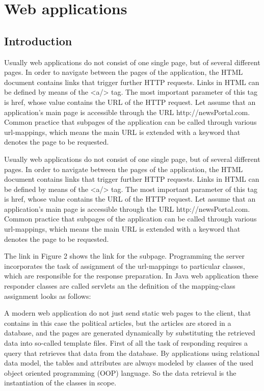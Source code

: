 \section{Web applications}

\subsection{Introduction}

Usually web applications do not consist of one single page, but of several different pages. In order to navigate between the pages of the application, the HTML document contains links that trigger further HTTP requests. Links in HTML can be defined by means of the <a/> tag.  The most important parameter of this tag is href, whose value contains the URL of the HTTP request. 
Let assume that an application’s main page is accessible through the URL http://newsPortal.com. Common practice that subpages of the application can be called through various url-mappings, which means the main URL is extended with a keyword that denotes the page to be requested. 


Usually web applications do not consist of one single page, but of several different pages. In order to navigate between the pages of the application, the HTML document contains links that trigger further HTTP requests. Links in HTML can be defined by means of the <a/> tag.  The most important parameter of this tag is href, whose value contains the URL of the HTTP request. 
Let assume that an application’s main page is accessible through the URL http://newsPortal.com. Common practice that subpages of the application can be called through various url-mappings, which means the main URL is extended with a keyword that denotes the page to be requested. 


The link in Figure 2 shows the link for the subpage. Programming the server incorporates the task of assignment of the url-mappings to particular classes, which are responsible for the response preparation. In Java web application these responder classes are called servlets an the definition of the mapping-class assignment looks as follows:


A modern web application do not just send static web pages to the client, that contains in this case the political articles, but the articles are stored in a database, and the pages are generated dynamically by substituting the retrieved data into so-called template files. 
First of all the task of responding requires a query that retrieves that data from the database. By applications using relational data model, the tables and attributes are always modeled by classes of the used object oriented programming (OOP) language. So the data retrieval is the instantiation of the classes in scope. 

